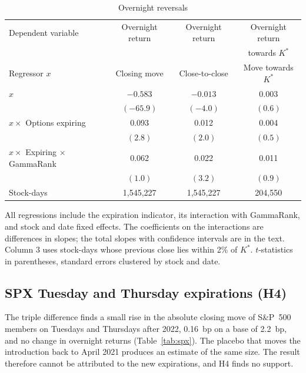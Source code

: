\documentclass[11pt,a4paper]{article}
\newcommand{\Kstar}{K^{*}}
\begin{document}
\begin{table}[ht]
\centering
\begin{threeparttable}
\caption{Overnight reversals}
\label{tab:rev}
\small
\begin{tabular}{lccc}
\toprule
Dependent variable & Overnight return & Overnight return & Overnight return \\
 & & & towards $\Kstar$ \\
Regressor $x$ & Closing move & Close-to-close & Move towards $\Kstar$ \\
\midrule
$x$ & $-0.583$ & $-0.013$ & 0.003 \\
 & $(-65.9)$ & $(-4.0)$ & $(0.6)$ \\
$x\times$ Options expiring & 0.093 & 0.012 & 0.004 \\
 & $(2.8)$ & $(2.0)$ & $(0.5)$ \\
$x\times$ Expiring $\times$ GammaRank & 0.062 & 0.022 & 0.011 \\
 & $(1.0)$ & $(3.2)$ & $(0.9)$ \\
\midrule
Stock-days & 1,545,227 & 1,545,227 & 204,550 \\
\bottomrule
\end{tabular}
\begin{tablenotes}\footnotesize
\item All regressions include the expiration indicator, its interaction with GammaRank, and stock and date fixed effects. The coefficients on the interactions are differences in slopes; the total slopes with confidence intervals are in the text. Column 3 uses stock-days whose previous close lies within 2\% of $\Kstar$. $t$-statistics in parentheses, standard errors clustered by stock and date.
\end{tablenotes}
\end{threeparttable}
\end{table}

\subsection{SPX Tuesday and Thursday expirations (H4)}
\label{sec:spx}

The triple difference finds a small rise in the absolute closing move of S\&P~500 members on Tuesdays and Thursdays after 2022, 0.16~bp on a base of 2.2~bp, and no change in overnight returns (Table~\ref{tab:spx}). The placebo that moves the introduction back to April 2021 produces an estimate of the same size. The result therefore cannot be attributed to the new expirations, and H4 finds no support.
\end{document}
